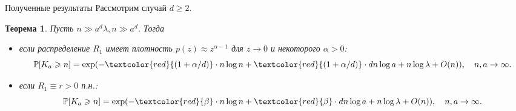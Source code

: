 \documentclass[aspectratio=1610]{beamer}
\theoremstyle{plain}
\newtheorem{thm}{Теорема} %
\theoremstyle{definition}
\theoremstyle{remark}
\def\geq{\geqslant}
\newcommand{\PP}{\mathbb{P}}
\begin{document}

    



\begin{frame}{Полученные результаты}
Рассмотрим случай $d \geq 2$.
\begin{thm}
Пусть $n\gg a^d\lambda, n\gg a^d$. Тогда
\begin{itemize}
    \item если распределение $R_1$ имеет плотность $p(z)\approx z^{\alpha-1}$ для $z\to 0$ и некоторого $\alpha > 0$:
    \begin{equation*}
    \PP[K_a\geq n] = \exp(-\textcolor{red}{(1+\alpha/d)}\cdot n\log n + \textcolor{red}{(1+\alpha/d)} \cdot dn\log a 
    +n\log\lambda +O(n)),\quad 
    n,a \to\infty.
\end{equation*}
\item если $R_1\equiv r>0$ п.н.:
\begin{equation*}
    \PP[K_a\geq n] = \exp(-\textcolor{red}{\beta} \cdot n\log n + \textcolor{red}{\beta}\cdot dn\log a 
    +n\log\lambda +O(n)),\quad 
    n,a \to\infty.
\end{equation*}

\end{itemize}
\end{thm}


\end{frame}{}
\end{document}
